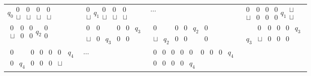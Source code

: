 \begin{frame}[allowframebreaks]
\begin{itemize}
\renewcommand{\arraystretch}{1.7}  
  \begin{tabular}{llll}
$ q_0
\begin{smallmatrix}
  0 &0 & 0 & 0 \\
  \sqcup & \sqcup & \sqcup & \sqcup
\end{smallmatrix}
$
&
$
\begin{smallmatrix}
  0 \\
  \sqcup 
\end{smallmatrix}
q_1
\begin{smallmatrix}
  0 & 0 & 0 \\
  \sqcup & \sqcup & \sqcup
\end{smallmatrix}
$
&           
$\cdots
$
&
$
\begin{smallmatrix}
  0 & 0 & 0 & 0\\
  \sqcup & 0  & 0 & 0
\end{smallmatrix}
q_1
\begin{smallmatrix}
  \sqcup\\
  \sqcup 
\end{smallmatrix}
$
\\
$
\begin{smallmatrix}
  0 & 0 & 0 \\
  \sqcup & 0  & 0 
\end{smallmatrix}
q_2
\begin{smallmatrix}
  0\\
  0
\end{smallmatrix}
$
&
$
\begin{smallmatrix}
  0 & 0 & & 0 & 0 & q_3\\
  \sqcup & 0 & q_3 & 0 & 0 &
\end{smallmatrix}
$
& 
$
\begin{smallmatrix}
  0 & & 0 & 0 & q_2 & 0\\
  \sqcup & q_2 & 0 & 0 &&  0 
\end{smallmatrix}
$
&
$
\begin{smallmatrix}
  & 0 & 0 & 0 & 0 & q_3\\
  q_3 & \sqcup & 0 & 0 & 0 
\end{smallmatrix}
$
\\
$
\begin{smallmatrix}
   0 & & 0 & 0 & 0 & 0 & q_4\\
  0 & q_4 & 0 & 0 & 0 & \sqcup
\end{smallmatrix}
$
& 
$\cdots$
&
$
\begin{smallmatrix}
   0 & 0 & 0 & 0 & 0 & 0 & 0 & 0 & q_4\\
  0 &  0 & 0 & 0 & q_4 &&&&
\end{smallmatrix}
$
&
\end{tabular}
\renewcommand{\arraystretch}{1}


\end{itemize}
\end{frame}
